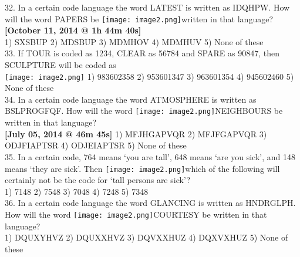 \documentclass[
]{article}
\begin{document}
32. In a certain code language the word LATEST is written as IDQHPW. How will the word
PAPERS be \texttt{[image: image2.png]}written in that language?\\
\textbf{[October 11, 2014 @ 1h 44m 40s]}\\
1) SXSBUP \hspace{2mm}2) MDSBUP \hspace{2mm}3) MDMHOV \hspace{2mm}4) MDMHUV \hspace{2mm}5) None of these\\

33. If TOUR is coded as 1234, CLEAR as 56784 and SPARE as 90847, then SCULPTURE will be
coded as\\
\texttt{[image: image2.png]}
1) 983602358 \hspace{2mm}2) 953601347 \hspace{2mm}3) 963601354 \hspace{2mm}4) 945602460 \hspace{2mm}5) None of these\\

34. In a certain code language the word ATMOSPHERE is written as BSLPROGFQF. How will
the word \texttt{[image: image2.png]}NEIGHBOURS be written in that language?\\
\textbf{[July 05, 2014 @ 46m 45s]}
1) MFJHGAPVQR \hspace{2mm}2) MFJFGAPVQR \hspace{2mm}3) ODJFIAPTSR \hspace{2mm}4) ODJEIAPTSR \hspace{2mm}5) None of these\\

35. In a certain code, 764 means ‘you are tall’, 648 means ‘are you sick’, and 148 means
‘they are sick’. Then \texttt{[image: image2.png]}which of the following will certainly not be the code for ‘tall
persons are sick’?\\
1) 7148 \hspace{2mm}2) 7548 \hspace{2mm}3) 7048 \hspace{2mm}4) 7248 \hspace{2mm}5) 7348\\

36. In a certain code language the word GLANCING is written as HNDRGLPH. How will the
word \texttt{[image: image2.png]}COURTESY be written in that language?\\
1) DQUXYHVZ \hspace{2mm}2) DQUXXHVZ \hspace{2mm}3) DQVXXHUZ \hspace{2mm}4) DQXVXHUZ \hspace{2mm}5) None of these\\
\end{document}
